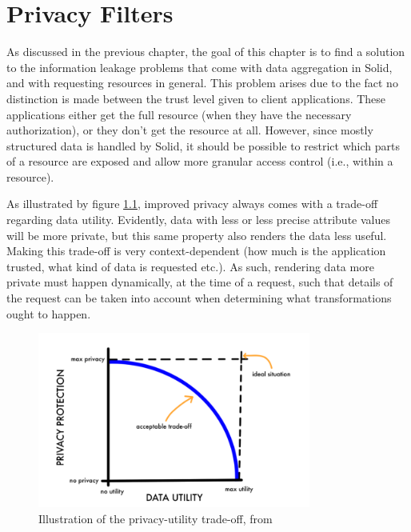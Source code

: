 \chapter{Privacy Filters}
\label{cha:privacy-filters}
As discussed in the previous chapter, the goal of this chapter is to find a solution to the information leakage problems that come with data aggregation in Solid, and with requesting resources in general. This problem arises due to the fact no distinction is made between the trust level given to client applications. These applications either get the full resource (when they have the necessary authorization), or they don't get the resource at all. However, since mostly structured data is handled by Solid, it should be possible to restrict which parts of a resource are exposed and allow more granular access control (i.e., within a resource).

As illustrated by figure \ref{fig:privacy-utility-tradeoff}, improved privacy always comes with a trade-off regarding data utility. Evidently, data with less or less precise attribute values will be more private, but this same property also renders the data less useful. Making this trade-off is very context-dependent (how much is the application trusted, what kind of data is requested etc.). As such, rendering data more private must happen dynamically, at the time of a request, such that details of the request can be taken into account when determining what transformations ought to happen.

\begin{figure}[h]
    \centering
    \includegraphics[width=0.8\textwidth]{images/privacy-filter/Data-Privacy-Protection-versus-Data-Utility.png}
    \caption{Illustration of the privacy-utility trade-off, from \citet{datasharing-implications}}
    \label{fig:privacy-utility-tradeoff}
\end{figure}

